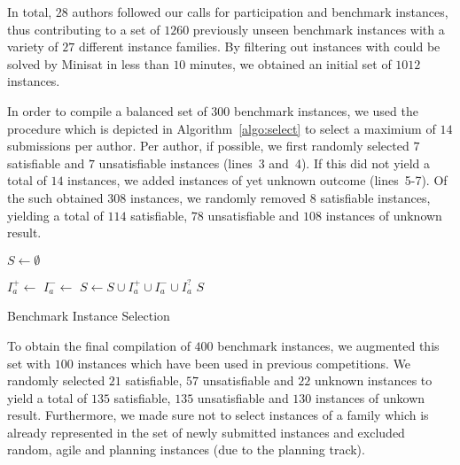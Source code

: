 \documentclass{elsarticle}
\begin{document}
In total, $28$ authors followed our calls for participation and benchmark instances, thus contributing to a set of $1260$ previously unseen benchmark instances with a variety of $27$ different instance families. 
By filtering out instances with could be solved by Minisat in less than $10$ minutes, we obtained an initial set of $1012$ instances. 

In order to compile a balanced set of $300$ benchmark instances, we used the procedure which is depicted in Algorithm~\ref{algo:select} to select a maximium of $14$ submissions per author. 
Per author, if possible, we first randomly selected $7$ satisfiable and $7$ unsatisfiable instances (lines~3 and~4). 
If this did not yield a total of $14$ instances, we added instances of yet unknown outcome (lines~5-7). 
Of the such obtained $308$ instances, we randomly removed $8$ satisfiable instances, yielding a total of $114$ satisfiable, $78$ unsatisfiable and $108$ instances of unknown result. 

\begin{algorithm}[t]
\DontPrintSemicolon

\BlankLine
$S \leftarrow \emptyset$\;

 {
	$I_a^+ \leftarrow$ \;	
	$I_a^- \leftarrow$ \;	
	$S \leftarrow S \cup I_a^+ \cup I_a^- \cup I_a^?$\;	
}
\Return $S$\;

\caption{Benchmark Instance Selection}
\label{algo:select}
\end{algorithm}

To obtain the final compilation of $400$ benchmark instances, we augmented this set with $100$ instances which have been used in previous competitions. 
We randomly selected $21$ satisfiable, $57$ unsatisfiable and $22$ unknown instances to yield a total of $135$ satisfiable, $135$ unsatisfiable and $130$ instances of unkown result. 
Furthermore, we made sure not to select instances of a family which is already represented in the set of newly submitted instances and excluded random, agile and planning instances (due to the planning track). 
\end{document}
